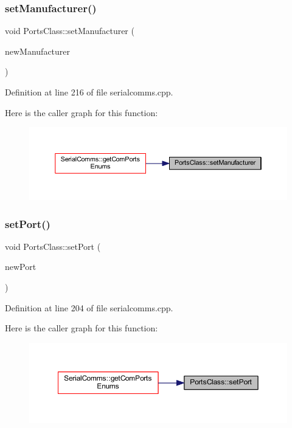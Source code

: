 \subsubsection{\texorpdfstring{setManufacturer()}{setManufacturer()}}
{\footnotesize\ttfamily void Ports\+Class\+::set\+Manufacturer (\begin{DoxyParamCaption}\item[{Q\+String}]{new\+Manufacturer }\end{DoxyParamCaption})}



Definition at line 216 of file serialcomms.\+cpp.

Here is the caller graph for this function\+:
\nopagebreak
\begin{figure}[H]
\begin{center}
\leavevmode
\includegraphics[width=350pt]{classPortsClass_a0ac6d29d8868c2ebde8811d0249d7e41_icgraph}
\end{center}
\end{figure}
\mbox{\label{classPortsClass_a0a7d3dc2ff387559e43d4bbb87aae0f7}} 
\subsubsection{\texorpdfstring{setPort()}{setPort()}}
{\footnotesize\ttfamily void Ports\+Class\+::set\+Port (\begin{DoxyParamCaption}\item[{Q\+String}]{new\+Port }\end{DoxyParamCaption})}



Definition at line 204 of file serialcomms.\+cpp.

Here is the caller graph for this function\+:
\nopagebreak
\begin{figure}[H]
\begin{center}
\leavevmode
\includegraphics[width=350pt]{classPortsClass_a0a7d3dc2ff387559e43d4bbb87aae0f7_icgraph}
\end{center}
\end{figure}
\mbox{\label{classPortsClass_a2bee64115fdaa041202522a909e66e00}} 
